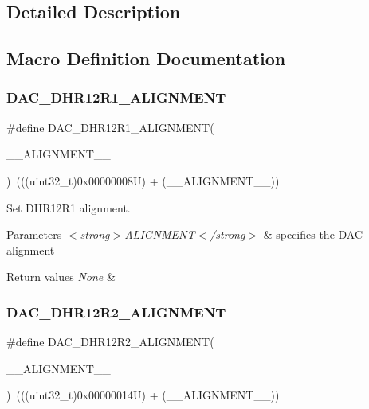 \subsection{Detailed Description}


\subsection{Macro Definition Documentation}
\mbox{\label{group___d_a_c___private___macros_gac3ebca33500c1a69df8b9b7ded88a9f5}} 
\subsubsection{\texorpdfstring{DAC\_DHR12R1\_ALIGNMENT}{DAC\_DHR12R1\_ALIGNMENT}}
{\footnotesize\ttfamily \#define D\+A\+C\+\_\+\+D\+H\+R12\+R1\+\_\+\+A\+L\+I\+G\+N\+M\+E\+NT(\begin{DoxyParamCaption}\item[{}]{\+\_\+\+\_\+\+A\+L\+I\+G\+N\+M\+E\+N\+T\+\_\+\+\_\+ }\end{DoxyParamCaption})~(((uint32\+\_\+t)0x00000008\+U) + (\+\_\+\+\_\+\+A\+L\+I\+G\+N\+M\+E\+N\+T\+\_\+\+\_\+))}



Set D\+H\+R12\+R1 alignment. 


\begin{DoxyParams}{Parameters}
{\em $<$strong$>$\+A\+L\+I\+G\+N\+M\+E\+N\+T$<$/strong$>$} & specifies the D\+AC alignment \\
\hline
\end{DoxyParams}

\begin{DoxyRetVals}{Return values}
{\em None} & \\
\hline
\end{DoxyRetVals}
\mbox{\label{group___d_a_c___private___macros_ga25186bb99978d84bb1b0103a1a023947}} 
\subsubsection{\texorpdfstring{DAC\_DHR12R2\_ALIGNMENT}{DAC\_DHR12R2\_ALIGNMENT}}
{\footnotesize\ttfamily \#define D\+A\+C\+\_\+\+D\+H\+R12\+R2\+\_\+\+A\+L\+I\+G\+N\+M\+E\+NT(\begin{DoxyParamCaption}\item[{}]{\+\_\+\+\_\+\+A\+L\+I\+G\+N\+M\+E\+N\+T\+\_\+\+\_\+ }\end{DoxyParamCaption})~(((uint32\+\_\+t)0x00000014\+U) + (\+\_\+\+\_\+\+A\+L\+I\+G\+N\+M\+E\+N\+T\+\_\+\+\_\+))}



